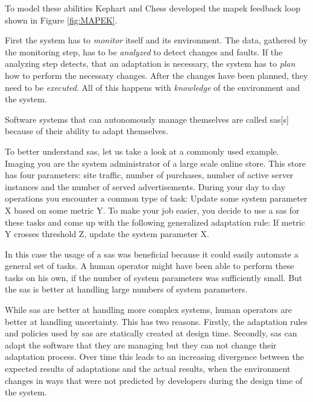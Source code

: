 \newpage
\noindent To model these abilities Kephart and Chess developed
the \acrfull{mapek} feedback loop \cite*{VisionOfAutonomicComputing} shown in Figure \ref{fig:MAPEK}.

\noindent First the system has to \textit{monitor} itself and its environment.
The data, gathered by the monitoring step, has to be \textit{analyzed} to detect changes and faults.
If the analyzing step detects, that an adaptation is necessary,
the system has to \textit{plan} how to perform the necessary changes.
After the changes have been planned, they need to be \textit{executed}.
All of this happens with \textit{knowledge} of the environment and the system.

\noindent Software systems that can autonomously manage themselves are called \acrfull{sas}[s]
because of their ability to adapt themselves.

\noindent To better understand \acrshort{sas}, let us take a look at a commonly used example.
Imaging you are the system administrator of a large scale online store.
This store has four parameters: site traffic, number of purchases, number of active server instances and the number of served advertisements.
During your day to day operations you encounter a common type of task:
Update some system parameter X based on some metric Y.
To make your job easier, you decide to use a \acrshort{sas} for these tasks
and come up with the following generalized adaptation rule:
If metric Y crosses threshold Z, update the system parameter X.

\noindent In this case the usage of a \acrshort{sas} was beneficial because it could easily
automate a general set of tasks.
A human operator might have been able to perform these tasks on his own,
if the number of system parameters was sufficiently small.
But the \acrshort{sas} is better at handling large numbers of system parameters.


\noindent While \acrshort{sas} are better at handling more complex systems,
human operators are better at handling uncertainty.
This has two reasons. 
Firstly, the adaptation rules and policies used by \acrshort{sas} are statically created at design time.
Secondly, \acrshort{sas} can adapt the software that they are managing but they can not change their adaptation process.
Over time this leads to an increasing divergence between the expected results of adaptations and the actual results,
when the environment changes in ways that were not predicted by developers during the design time of the system.

